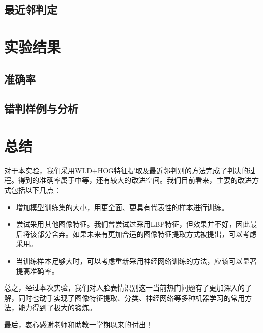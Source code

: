 \documentclass[UTF8]{ctexart}
\begin{document}
\subsection{最近邻判定}

\section{实验结果}

\subsection{准确率}

%
%

\subsection{错判样例与分析}

\section{总结}

对于本实验，我们采用WLD+HOG特征提取及最近邻判别的方法完成了判决的过程。得到的准确率属于中等，还有较大的改进空间。我们目前看来，主要的改进方式包括以下几点：
\begin{itemize}
  \item 增加模型训练集的大小，用更全面、更具有代表性的样本进行训练。
  \item 尝试采用其他图像特征。我们曾尝试过采用LBP特征，但效果并不好，因此最后将该部分舍弃。如果未来有更加合适的图像特征提取方式被提出，可以考虑采用。
  \item 当训练样本足够大时，可以考虑重新采用神经网络训练的方法，应该可以显著提高准确率。
\end{itemize}

总之，经过本次实验，我们对人脸表情识别这一当前热门问题有了更加深入的了解，同时也动手实现了图像特征提取、分类、神经网络等多种机器学习的常用方法，能力得到了极大的锻炼。

最后，衷心感谢老师和助教一学期以来的付出！



\end{document}
